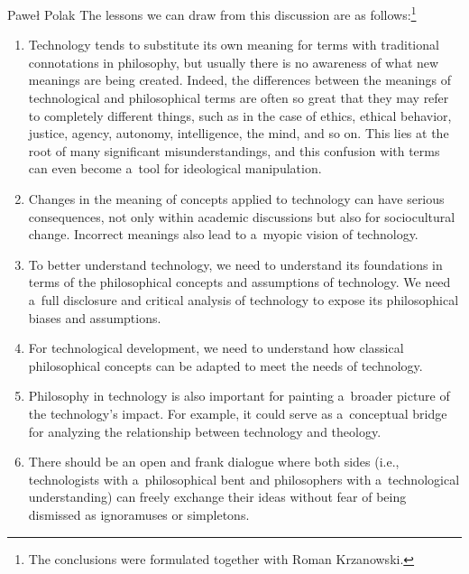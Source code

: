 \begin{artengenv}{Paweł Polak}
The lessons we can draw from this discussion are as follows:\footnote{The conclusions were formulated together with Roman Krzanowski.}


\begin{enumerate}[label=(\arabic*)]
\item Technology tends to substitute its own meaning for terms with traditional connotations in philosophy, but usually there is no awareness of what new meanings are being created. Indeed, the differences between the meanings of technological and philosophical terms are often so great that they may refer to completely different things, such as in the case of ethics, ethical behavior, justice, agency, autonomy, intelligence, the mind, and so on. This lies at the root of many significant misunderstandings, and this confusion with terms can even become a~tool for ideological manipulation.



\item Changes in the meaning of concepts applied to technology can have serious consequences, not only within academic discussions but also for sociocultural change. Incorrect meanings also lead to a~myopic vision of technology.



\item To better understand technology, we need to understand its foundations in terms of the philosophical concepts and assumptions of technology. We need a~full disclosure and critical analysis of technology to expose its philosophical biases and assumptions.



\item For technological development, we need to understand how classical philosophical concepts can be adapted to meet the needs of technology.



\item Philosophy in technology is also important for painting a~broader picture of the technology's impact. For example, it could serve as a~conceptual bridge for analyzing the relationship between technology and theology.



\item There should be an open and frank dialogue where both sides (i.e., technologists with a~philosophical bent and philosophers with a~technological understanding) can freely exchange their ideas without fear of being dismissed as ignoramuses or simpletons.
\end{enumerate}



\end{artengenv}
